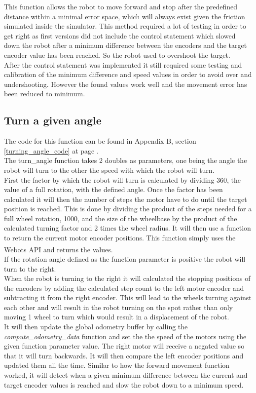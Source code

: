 This function allows the robot to move forward and stop after the predefined distance within a minimal error space, which will always exist given the friction simulated inside the simulator. This method required a lot of testing in order to get right as first versions did not include the control statement which slowed down the robot after a minimum difference between the encoders and the target encoder value has been reached. So the robot used to overshoot the target. \\
After the control statement was implemented it still required some testing and calibration of the minimum difference and speed values in order to avoid over and undershooting. However the found values work well and the movement error has been reduced to minimum.\\

\subsection{Turn a given angle}
\label{turn_angle_description}
The code for this function can be found in Appendix B, section \ref{turning_angle_code} at page \pageref{turning_angle_code}.\\
The turn\_angle function takes 2 doubles as parameters, one being the angle the robot will turn to the other the speed with which the robot will turn.\\
First the factor by which the robot will turn is calculated by dividing 360, the value of a full rotation, with the defined angle.
Once the factor has been calculated it will then the number of steps the motor have to do until the target position is reached. This is done by dividing the product of the steps needed for a full wheel rotation, 1000, and the size of the wheelbase by the product of the calculated turning factor and 2 times the wheel radius. It will then use a function to return the current motor encoder positions. This function simply uses the Webots\textsuperscript{\texttrademark}  API and returns the values. \\[3ex]

If the rotation angle defined as the function parameter is positive the robot will turn to the right.\\
When the robot is turning to the right it will calculated the stopping positions of the encoders by adding the calculated step count to the left motor encoder and subtracting it from the right encoder. This will lead to the wheels turning against each other and will result in the robot turning on the spot rather than only moving 1 wheel to turn which would result in a displacement of the robot. \\
It will then update the global odometry buffer by calling the \textit{compute\_odometry\_data} function and set the the speed of the motors using the given function parameter value. The right motor will receive a negated value so that it will turn backwards. 
It will then compare the left encoder positions and updated them all the time. Similar to how the forward movement function worked, it will detect when a given minimum difference between the current and target encoder values is reached and slow the robot down to a minimum speed. \\[3ex]


